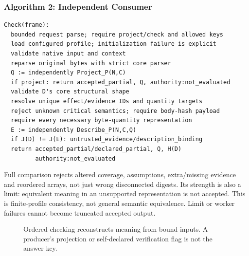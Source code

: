 \documentclass[11pt,letterpaper]{article}
\begin{document}
\par\noindent\begin{minipage}{\linewidth}
\subsubsection*{Algorithm 2: Independent Consumer}
\begin{lstlisting}
Check(frame):
  bounded request parse; require project/check and allowed keys
  load configured profile; initialization failure is explicit
  validate native input and context
  reparse original bytes with strict core parser
  Q := independently Project_P(N,C)
  if project: return accepted_partial, Q, authority:not_evaluated
  validate D's core structural shape
  resolve unique effect/evidence IDs and quantity targets
  reject unknown critical semantics; require body-hash payload
  require every necessary byte-quantity representation
  E := independently Describe_P(N,C,Q)
  if J(D) != J(E): untrusted_evidence/description_binding
  return accepted_partial/declared_partial, Q, H(D)
         authority:not_evaluated
\end{lstlisting}
\end{minipage}\par

Full comparison rejects altered coverage, assumptions, extra/missing evidence
and reordered arrays, not just wrong disconnected digests. Its strength is also
a limit: equivalent meaning in an unsupported representation is not accepted.
This is finite-profile consistency, not general semantic equivalence. Limit or
worker failures cannot become truncated accepted output.

\begin{figure}[tbp]
\centering
{}
\caption{Ordered checking reconstructs meaning from bound inputs. A producer's
projection or self-declared verification flag is not the answer key.}
\label{fig:checker}
\end{figure}
\end{document}
